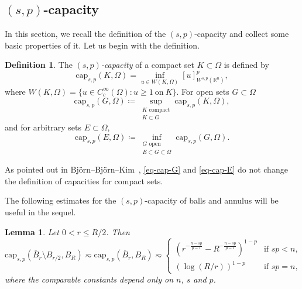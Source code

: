 \documentclass[11pt]{amsart}
\theoremstyle{plain}
\newtheorem{lemma}[theorem]{Lemma}
\theoremstyle{definition}
\newtheorem{definition}[theorem]{Definition}
\numberwithin{equation}{section}
\begin{document}
\subsection{\texorpdfstring{$(s, p)$}{(s, p)}-capacity}\label{sec-capacity}

In this section, we recall the definition of the $(s, p)$-capacity and collect some basic properties of it. Let us begin with the definition.

\begin{definition}
	The \emph{$(s, p)$-capacity} of a compact set $K \subset \Omega$ is defined by
	\begin{equation*}
		\mathrm{cap}_{s, p}(K, \Omega) = \inf_{u \in W(K, \Omega)} {[u]_{W^{s, p}(\mathbb{R}^n)}^p},
	\end{equation*}
	where $W(K, \Omega) = \{u \in C^\infty_c(\Omega): u \geq 1~\text{on}~K \}$. For open sets $G \subset \Omega$
 \begin{equation}   \label{eq-cap-G}
		\mathrm{cap}_{s, p}(G,\Omega) \coloneqq \sup_{\substack{K \text{ compact}\\ K \subset G}} \mathrm{cap}_{s, p}(K,\Omega),
\end{equation}
and for arbitrary sets $E \subset \Omega$,
\begin{equation}  \label{eq-cap-E}
		\mathrm{cap}_{s, p}(E,\Omega) \coloneqq \inf_{\substack{G \text{ open}\\ E \subset G \subset \Omega}} \mathrm{cap}_{s, p}(G,\Omega).
\end{equation}
\end{definition}


As pointed out in Bj\"orn--Bj\"orn--Kim~\cite[Section~5]{BBK24}, \eqref{eq-cap-G} and \eqref{eq-cap-E} do not change the definition of capacities for compact sets.

The following estimates for the $(s, p)$-capacity of balls and annulus will be useful in the sequel.

\begin{lemma}\label{lem-cap-ball}
	Let $0<r \leq R/2$. Then
	\begin{equation*}
		\mathrm{cap}_{s, p}(\overline{B}_r \setminus B_{r/2}, B_R) \eqsim \mathrm{cap}_{s,p}(\overline{B}_r, B_R) \eqsim 
		\begin{cases}
			\left(r^{-\frac{n-sp}{p-1}}-R^{-\frac{n-sp}{p-1}} \right)^{1-p} &\text{if } sp<n, \\
			(\log(R/r))^{1-p}  &\text{if } sp=n,
		\end{cases}
	\end{equation*}
	where the comparable constants depend only on $n$, $s$ and $p$.
\end{lemma}
\end{document}
